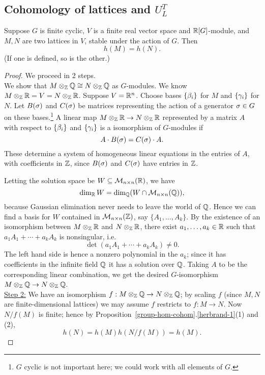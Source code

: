 \subsection{Cohomology of lattices and $U_L^T$}
\begin{pr}
Suppose $G$ is finite cyclic, $V$ is a finite real vector space and $\mathbb{R}[G]$-module, and $M,N$ are two lattices in $V$, stable under the action of $G$. Then
\[
h(M)=h(N).
\]
(If one is defined, so is the other.)
\end{pr}
\begin{proof}
We proceed in 2 steps.\\

 We show that $M\otimes_{\mathbb{Z}}\mathbb{Q}\cong N\otimes_{\mathbb{Z}} \mathbb{Q}$ as $G$-modules. We know $M\otimes_{\mathbb{Z}}\mathbb{R}=V=N\otimes_{\mathbb{Z}} \mathbb{R}$. Suppose $V=\mathbb{R}^n$. Choose bases $\{\beta_i\}$ for $M$ and $\{\gamma_i\}$ for $N$. Let $B(\sigma)$ and $C(\sigma)$ be matrices representing the action of a generator $\sigma\in G$ on these bases.\footnote{$G$ cyclic is not important here; we could work with all elements of $G$.} A linear map $M\otimes_{\mathbb{Z}}\mathbb{R}\to N\otimes_{\mathbb{Z}} \mathbb{R}$ represented by a matrix $A$ with respect to $\{\beta_i\}$ and $\{\gamma_i\}$ is a isomorphism of $G$-modules if
\[
A\cdot B(\sigma)=C(\sigma)\cdot A.
\]
These determine a system of homogeneous linear equations in the entries of $A$, with coefficients in $\mathbb{Z}$, since $B(\sigma)$ and $C(\sigma)$ have entries in $\mathbb{Z}$. 

Letting the solution space be $W\subseteq \mathcal{M}_{n\times n}(\mathbb{R})$, we have 
\[
\dim_{\mathbb{R}} W=\dim_{\mathbb{Q}}(W\cap \mathcal{M}_{n\times n}(\mathbb{Q})),
\]
because Gaussian elimination never needs to leave the world of $\mathbb{Q}$. Hence we can find a basis for $W$ contained in $\mathcal{M}_{n\times n}(\mathbb{Z})$, say $\{A_1,\ldots, A_k\}$. By the existence of an isomorphism between $M\otimes_{\mathbb{Z}}\mathbb{R}$ and $N\otimes_{\mathbb{Z}} \mathbb{R}$, there exist $a_1,\ldots, a_k\in \mathbb{R}$ such that $a_1A_1+\cdots +a_kA_k$ is nonsingular, i.e.
\[
\det(a_1A_1+\cdots +a_kA_k)\ne 0.
\]
The left hand side is hence a nonzero polynomial in the $a_k$; since it has coefficients in the infinite field $\mathbb{Q}$ it has a solution over $\mathbb{Q}$. 
Taking $A$ to be the corresponding linear combination, we get the desired $G$-isomorphism $M\otimes_{\mathbb{Z}}\mathbb{Q}\to N\otimes_{\mathbb{Z}} \mathbb{Q}$.\\

\noindent\underline{Step 2:} We have an isomorphism $f:M\otimes_{\mathbb{Z}}\mathbb{Q}\to N\otimes_{\mathbb{Z}} \mathbb{Q}$; by scaling $f$ (since $M,N$ are finite-dimensional lattices) we may assume $f$ restricts to $f:M\to N$. Now $N/f(M)$ is finite; hence by Proposition~\ref{group-hom-cohom}.\ref{herbrand-1}(1) and (2),
\[
h(N)=h(M)h(N/f(M))=h(M).
\]
\end{proof}

